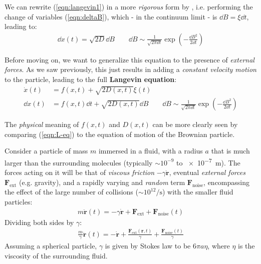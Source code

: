 \documentclass[../template.tex]{subfiles}
\begin{document}
We can rewrite (\ref{eqn:langevin1}) in a more \textit{rigorous} form by , i.e. performing the change of variables (\ref{eqn:deltaB}), which - in the continuum limit - is $\dd{B} = \xi \dd{t}$, leading to:
\begin{align*}
    \dd{x(t)} = \sqrt{2 D} \dd{B} \qquad \dd{B} \sim \frac{1}{\sqrt{2 \pi \dd{t}}} \exp\left(-\frac{\dd{B}^2}{2 \dd{t}} \right) 
\end{align*}  

\begin{comment}
\begin{align*}
    \xi(t_i) \sim \sqrt{\frac{\Delta t_i}{2 \pi} } \exp\left(-\frac{\Delta t_i \xi_i^2}{2 } \right)
\end{align*}  
and then:
\begin{align*}
    P(\xi \dots ) \propto \exp\left(-\frac{1}{2} \int \xi^2 (\tau) \dd{\tau} \right)
\end{align*}
and $\langle \xi(\tau) \rangle = 0$, $\langle \xi (\tau) \xi (\tau') \rangle = \delta(\tau - \tau')$.
\end{comment}

Before moving on, we want to generalize this equation to the presence of \textit{external forces}. As we saw previously, this just results in adding a \textit{constant velocity motion} to the particle, leading to the full \textbf{Langevin equation}: 
\begin{align}\nonumber
    \dot{x}(t) &= f(x,t) + \sqrt{2 D(x,t)}\xi(t)\\
    \dd{x(t)} &= f(x,t) \dd{t} + \sqrt{2 D(x,t)} \dd{B} \qquad \dd{B} \sim \frac{1}{\sqrt{2 \pi \dd{t}}} \exp\left(-\frac{\dd{B}^2}{2 \dd{t}} \right) 
    \label{eqn:L-eq}
\end{align} 

The \textit{physical} meaning of $f(x,t)$ and $D(x,t)$ can be more clearly seen by comparing (\ref{eqn:L-eq}) to the equation of motion of the Brownian particle.

Consider a particle of mass $m$ immersed in a fluid, with a radius $a$ that is much larger than the surrounding molecules (typically $\sim 10^{-9}$ to \SI{e-7}{\m}). The forces acting on it will be that of \textit{viscous friction} $-\gamma \dot{\bm{r}}$, eventual \textit{external forces} $\bm{F}_{\mathrm{ext} }$ (e.g. gravity), and a rapidly varying and \textit{random} term $\bm{F}_{\mathrm{noise}}$, encompassing the effect of the large number of collisions ($\sim 10^{12}/\si{\s}$) with the smaller fluid particles:   
\begin{align*}
    m \ddot{\bm{r}} (t) = - \gamma\dot{\bm{r}} + \bm{F}_{\mathrm{ext} } + \bm{F}_{\mathrm{noise} }(t)
\end{align*}
Dividing both sides by $\gamma$:
\begin{align}
    \frac{m}{\gamma} \ddot{\bm{r}}(t) = - \dot{\bm{r}} + \frac{\bm{F}_{\mathrm{ext} }(\bm{r},t)}{\gamma} + \frac{\bm{F}_{\mathrm{noise} }(t)}{\gamma}  
    \label{eqn:N1}
\end{align}
Assuming a spherical particle, $\gamma$ is given by Stokes law to be $6 \pi a \eta$, where $\eta$ is the viscosity of the surrounding fluid. 
\end{document}
